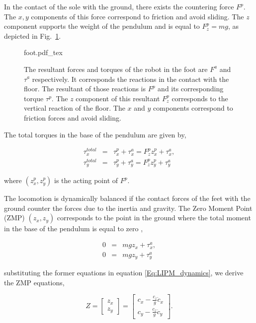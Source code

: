 In the contact of the sole with the ground, there exists the countering force $F^p$. The $x,y$ components of this force correspond to friction and avoid sliding. The $z$ component supports the weight of the pendulum and is equal to $F^p_z = mg$, as depicted in Fig.~\ref{Fig:Foot-Sole}.

\begin{figure}
  \centering
      {\def\svgwidth{0.5\columnwidth}
        
                   {foot.pdf_tex}}
      \caption[]{The resultant forces and torques of the robot in the foot are $F^a$ and $\tau^a$ respectively. It corresponds the reactions in the contact with the floor. The resultant of those reactions is $F^p$ and its corresponding torque $\tau^p$. The $z$ component of this resultant $F^p_z$ corresponds to the vertical reaction of the floor. The $x$ and $y$ components correspond to friction forces and avoid sliding.}
      \label{Fig:Foot-Sole}
\end{figure}

The total torques in the base of the pendulum are given by,

\begin{eqnarray*}
\label{Eq:LIPM_total_torques}
\tau^{total}_{x} &=& \tau^p_x + \tau^a_x = F^p_z z^p_x + \tau^a_x, \\
\tau^{total}_{y} &=& \tau^p_y + \tau^a_y = F^p_z z^p_y + \tau^a_y
\end{eqnarray*}

where $(z^p_x, z^p_y)$ is the acting point of $F^p$.

The locomotion is dynamically balanced if the contact forces of the feet with the ground counter the forces due to the inertia and gravity. The Zero Moment Point (ZMP) $(z_x,z_y)$ corresponds to the point in the ground where the total moment in the base of the pendulum is equal to zero \citep{Vukobratovic1972,Vukobratovic2004},

\begin{eqnarray}
0 &=& m g z_x + \tau^a_x, \\
0 &=& m g z_y + \tau^a_y
\end{eqnarray}

substituting the former equations in equation \ref{Eq:LIPM_dynamics}, we derive the ZMP equations,

\begin{equation}
\label{Eq:LIPM_ZMP}
Z = 
\left[
\begin{matrix}
z_x \\ z_y
\end{matrix}
\right] = 
\left[
\begin{matrix}
c_x - \frac{c_z}{g}\ddot{c}_x \\ c_y - \frac{c_z}{g}\ddot{c}_y
\end{matrix}
\right].
\end{equation}


